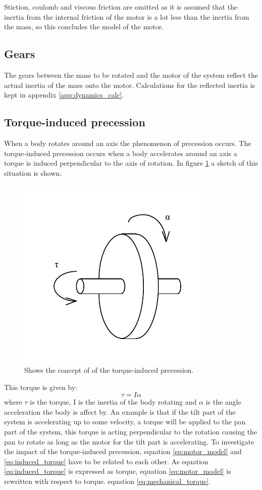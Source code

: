 Stiction, coulomb and viscous friction are omitted as it is assumed that the inertia from the internal friction of the motor is a lot less than the inertia from the mass, so this concludes the model of the motor.

\subsection{Gears}
The gears between the mass to be rotated and the motor of the system reflect the actual inertia of the mass onto the motor. Calculations for the reflected inertia is kept in appendix \ref{app:dynamics_calc}.
  
\subsection{Torque-induced precession}
When a body rotates around an axis the phenomenon of precession occurs. The torque-induced precession occurs when a body accelerates around an axis a torque is induced perpendicular to the axis of rotation. In figure \ref{fig:precession} a sketch of this situation is shown.
\begin{figure}[htb]
	\centering
	\includegraphics[scale=1,trim=0 0 0 0]{graphics/precession.pdf} %
	\caption{Shows the concept of of the torque-induced precession.}
	\label{fig:precession}			%
\end{figure}
This torque is given by:
\begin{equation}
	\tau = I\alpha\label{eq:induced_torque}
\end{equation}
where $\tau$ is the torque, I is the inertia of the body rotating and $\alpha$ is the angle acceleration the body is affect by. An example is that if the tilt part of the system is accelerating up to some velocity, a torque will be applied to the pan part of the system, this torque is acting perpendicular to the rotation causing the pan to rotate as long as the motor for the tilt part is accelerating. To investigate the impact of the torque-induced precession, equation \ref{eq:motor_model} and \ref{eq:induced_torque} have to be related to each other. As equation \ref{eq:induced_torque} is expressed as torque, equation \ref{eq:motor_model} is rewritten with respect to torque. equation \ref{eq:mechanical_torque}.
